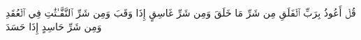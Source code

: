 قُلۡ أَعُوذُ بِرَبِّ ٱلۡفَلَقِ
مِن شَرِّ مَا خَلَقَ
وَمِن شَرِّ غَاسِقٍ إِذَا وَقَبَ
وَمِن شَرِّ ٱلنَّفَّـٰثَٰتِ فِي ٱلۡعُقَدِ
وَمِن شَرِّ حَاسِدٍ إِذَا حَسَدَ
